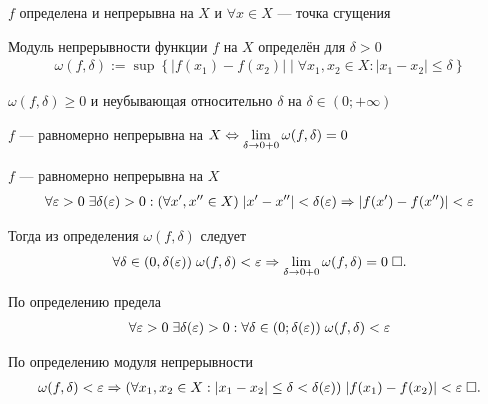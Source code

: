 \documentclass{article}
\begin{document}


$f$ определена и непрерывна на $X$ и $\forall x \in X$ --- точка сгущения

Модуль непрерывности функции $f$ на $X$ определён для $\delta>0$
\begin{align*}
	\omega (f, \delta):=\sup\left\{|f(x_1)-f(x_2)|\;\big|\;\forall x_1,x_2\in X:|x_1-x_2|\leq\delta\right\}
\end{align*}

$\omega (f, \delta) \geq 0$ и неубывающая относительно $\delta$ на $\delta\in(0;+\infty)$

\theorem

$f$ --- равномерно непрерывна на $X \Leftrightarrow \lim\limits_{\delta \to 0 + 0} \omega (f,\delta) = 0$

\onlyif

$f$ --- равномерно непрерывна на $X$
\begin{align*}
	\forall \varepsilon > 0\;\exists \delta (\varepsilon) > 0:(\forall x', x'' \in X)\;|x' - x''| < \delta(\varepsilon)\Rightarrow|f(x') - f(x'')| < \varepsilon
\end{align*}

Тогда из определения $\omega(f,\delta)$ следует
\begin{align*}
	\forall \delta \in (0, \delta (\varepsilon))\; \omega (f, \delta) < \varepsilon\Rightarrow\lim\limits_{\delta\to 0+0}\omega(f,\delta)=0\;\square.
\end{align*}

\enough

По определению предела
\begin{align*}
	\forall \varepsilon>0\;\exists \delta(\varepsilon)>0:\forall \delta\in(0;\delta(\varepsilon))\;\omega(f,\delta)<\varepsilon
\end{align*}

По определению модуля непрерывности
\begin{align*}
	\omega(f,\delta)<\varepsilon\Rightarrow(\forall x_1,x_2\in X:|x_1-x_2|\leq\delta<\delta(\varepsilon))\;|f(x_1)-f(x_2)|<\varepsilon\;\square.
\end{align*}
\end{document}
